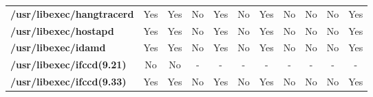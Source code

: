 \begin{center}
{\begin{tabular}{|>{\bfseries} l | C | C | C | C | C | C | C | C | C | C |}
					/usr/libexec/hangtracerd & Yes & Yes & \color{green}No & \color{red}Yes & \color{green}No & \color{red}Yes & No & No & \color{green}No & \color{red}Yes\\ 
					/usr/libexec/hostapd & Yes & Yes & \color{green}No & \color{red}Yes & \color{green}No & \color{red}Yes & No & No & \color{green}No & \color{red}Yes\\ 
					/usr/libexec/idamd & Yes & Yes & \color{green}No & \color{red}Yes & \color{green}No & \color{red}Yes & No & No & \color{green}No & \color{red}Yes\\ 
					/usr/libexec/ifccd(9.21) & No & No & - & - & - & - & - & - & - & -\\ 
					/usr/libexec/ifccd(9.33) & Yes & Yes & \color{green}No & \color{red}Yes & \color{green}No & \color{red}Yes & No & No & \color{green}No & \color{red}Yes\\ 

			\end{tabular}
		}
	\end{center}



